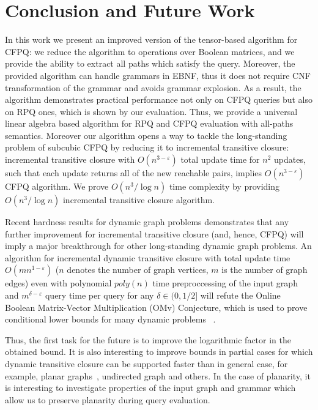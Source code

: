 \section{Conclusion and Future Work}

In this work we present an improved version of the tensor-based algorithm for CFPQ: we reduce the algorithm to operations over Boolean matrices, and we provide the ability to extract all paths which satisfy the query.
Moreover, the provided algorithm can handle grammars in EBNF, thus it does not require CNF transformation of the grammar and avoids grammar explosion.
As a result, the algorithm demonstrates practical performance not only on CFPQ queries but also on RPQ ones, which is shown by our evaluation.
Thus, we provide a universal linear algebra based algorithm for RPQ and CFPQ evaluation with all-paths semantics.
Moreover our algorithm opens a way to tackle the long-standing problem of subcubic CFPQ by reducing it to incremental transitive closure: incremental transitive closure with $O(n^{3-\varepsilon})$ total update time for $n^2$ updates, such that each update returns all of the new reachable pairs, implies $O(n^{3-\varepsilon})$ CFPQ algorithm.
We prove $O(n^3/\log{n})$ time complexity by providing $O(n^3/\log{n})$ incremental transitive closure algorithm.


Recent hardness results for dynamic graph problems demonstrates that any further improvement for incremental transitive closure (and, hence, CFPQ) will imply a major breakthrough for other long-standing dynamic graph problems. An algorithm for incremental dynamic transitive closure with total update time $O(mn^{1-\varepsilon})$ ($n$ denotes the number of graph vertices, $m$ is the number of graph edges) even with polynomial $poly(n)$ time preproccessing of the input graph and $m^{\delta - \varepsilon}$ query time per query for any $\delta \in (0, 1/2]$ will refute the Online Boolean Matrix-Vector Multiplication (OMv) Conjecture, which is used to prove conditional lower bounds for many dynamic problems ~\citep{8948597, 10.1145/2746539.2746609}.


Thus, the first task for the future is to improve the logarithmic factor in the obtained bound.
It is also interesting to improve bounds in partial cases for which dynamic transitive closure can be supported faster than in general case, for example, planar graphs~\citep{10.1007/3-540-57273-2_72}, undirected graph and others.
In the case of planarity, it is interesting to investigate properties of the input graph and grammar which allow us to preserve planarity during query evaluation.


